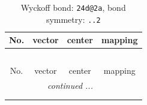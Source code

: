 \documentclass[fleqn,8pt]{jsarticle}
\begin{document}
\renewcommand{\arraystretch}{1.2}
\begin{longtable}{cccc}
\caption{Wyckoff bond: {\tt 24d@2a}, bond symmetry: {\tt ..2}}
 \\
 \hline \hline
No. & vector & center & mapping \\ \hline \endfirsthead

\multicolumn{3}{l}{\tablename\ \thetable{}} \\
 \hline \hline
No. & vector & center & mapping \\ \hline \endhead

 \hline \hline
\multicolumn{3}{r}{\footnotesize\it continued ...} \\ \endfoot

 \hline \hline
\multicolumn{3}{r}{} \\ \endlastfoot


\end{longtable}
\end{document}
